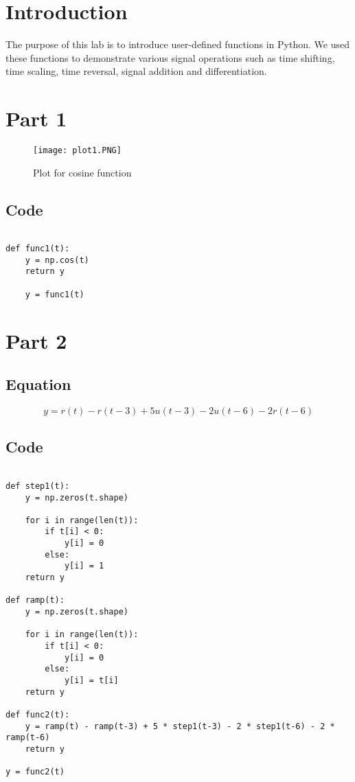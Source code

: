 \newpage
\section{Introduction}

The purpose of this lab is to introduce user-defined functions in Python.  We used these functions to demonstrate various signal operations such as time shifting, time scaling, time reversal, signal addition and differentiation.

\section{Part 1}

 \begin{figure}[H]
	   \centering
	   \texttt{[image: plot1.PNG]}
	   \caption{Plot for cosine function}
	 \end{figure}

\subsection{Code}

\begin{lstlisting}
	
def func1(t):
	y = np.cos(t)
	return y
	
	y = func1(t)
\end{lstlisting}



\section{Part 2}
\subsection{Equation}
\[y = r(t) - r(t-3) + 5u(t-3) - 2u(t-6) - 2r(t-6)\]


\subsection{Code}

\begin{lstlisting}

def step1(t):
    y = np.zeros(t.shape)
    
    for i in range(len(t)):
        if t[i] < 0:
            y[i] = 0
        else:
            y[i] = 1
    return y

def ramp(t):
    y = np.zeros(t.shape)
    
    for i in range(len(t)):
        if t[i] < 0:
            y[i] = 0
        else:
            y[i] = t[i]
    return y

def func2(t):
    y = ramp(t) - ramp(t-3) + 5 * step1(t-3) - 2 * step1(t-6) - 2 * ramp(t-6)
    return y

y = func2(t)

\end{lstlisting}

